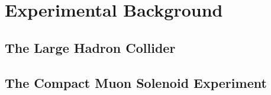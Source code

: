 \chapter{Experimental Background}
\label{ch:experiment}

\section{The Large Hadron Collider}

\section{The Compact Muon Solenoid Experiment}
